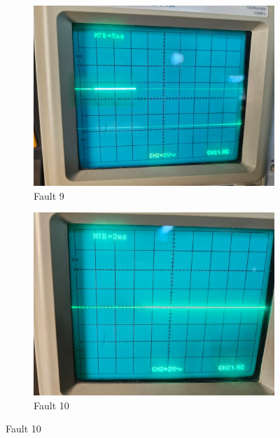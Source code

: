 \documentclass[a4paper,12pt]{article}
\begin{document}
\begin{figure}[H]
	\centering
	\begin{subfigure}[t]{0.44\textwidth}
		\centering
		\includegraphics[width=1\linewidth]{Images/1.9}
		\caption{Fault 9}
		\vspace{0.1cm}
	\end{subfigure}
	\hfil
	\begin{subfigure}[t]{0.44\textwidth}
		\centering
		\includegraphics[width=1\linewidth]{Images/1.10}
		\caption{Fault 10}
		\vspace{0.1cm}
	\end{subfigure}
	

\end{figure}
\end{document}
